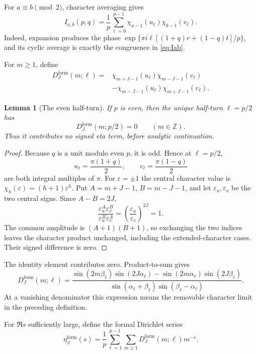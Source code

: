\documentclass[11pt]{article}
\newtheorem{lemma}[theorem]{Lemma}
\theoremstyle{definition}
\newcommand{\Z}{\mathbb Z}
\begin{document}
For $a\equiv b\pmod2$, character averaging gives
\begin{equation}
 I_{a,b}(p,q)=\frac1p\sum_{\ell=0}^{p-1}
 \chi_{a-1}(u_\ell)\chi_{b-1}(v_\ell).
 \label{eq:character-projector}
\end{equation}
Indeed, expansion produces the phase
$\exp\{\pi i\ell[(1+q)r+(1-q)t]/p\}$, and its cyclic average is exactly the
congruence in \eqref{eq:Iab}.

For $m\geq1$, define
\begin{align*}
 D_J^{\mathrm{form}}(m;\ell)
={}&\chi_{m+J-1}(u_\ell)\chi_{m-J-1}(v_\ell)\\
&-\chi_{m-J-1}(u_\ell)\chi_{m+J-1}(v_\ell).
\end{align*}

\begin{lemma}[The even half-turn]
\label{lem:even-half-turn}
If $p$ is even, then the unique half-turn $\ell=p/2$ has
\[
 D_J^{\mathrm{form}}(m;p/2)=0
 \qquad(m\in\Z).
\]
Thus it contributes no signed eta term, before analytic continuation.
\end{lemma}

\begin{proof}
Because $q$ is a unit modulo even $p$, it is odd.  Hence at $\ell=p/2$,
\[
 u_\ell=\frac{\pi(1+q)}2,
 \qquad
 v_\ell=\frac{\pi(1-q)}2
\]
are both integral multiples of $\pi$.  For $\varepsilon=\pm1$ the central
character value is $\chi_h(\varepsilon)=(h+1)\varepsilon^h$.  Put
$A=m+J-1$, $B=m-J-1$, and let $\varepsilon_u,\varepsilon_v$ be the two
central signs.  Since $A-B=2J$,
\[
 \frac{\varepsilon_u^A\varepsilon_v^B}
      {\varepsilon_u^B\varepsilon_v^A}
 =\left(\frac{\varepsilon_u}{\varepsilon_v}\right)^{2J}=1.
\]
The common amplitude is $(A+1)(B+1)$, so exchanging the two indices leaves
the character product unchanged, including the extended-character cases.
Their signed difference is zero.
\end{proof}

The identity element contributes zero.  Product-to-sum gives
\begin{equation}
 D_J^{\mathrm{form}}(m;\ell)=
 \frac{
 \sin(2m\beta_\ell)\sin(2J\alpha_\ell)
 -\sin(2m\alpha_\ell)\sin(2J\beta_\ell)}
 {\sin(\alpha_\ell+\beta_\ell)\sin(\beta_\ell-\alpha_\ell)}.
\label{eq:formal-character}
\end{equation}
At a vanishing denominator this expression means the removable character
limit in the preceding definition.

For $\Re s$ sufficiently large, define the formal Dirichlet series
\[
 \eta_J^{\mathrm{form}}(s)
 =\frac1p\sum_{\ell=1}^{p-1}\sum_{m\geq1}
  D_J^{\mathrm{form}}(m;\ell)m^{-s}.
\]
\end{document}
